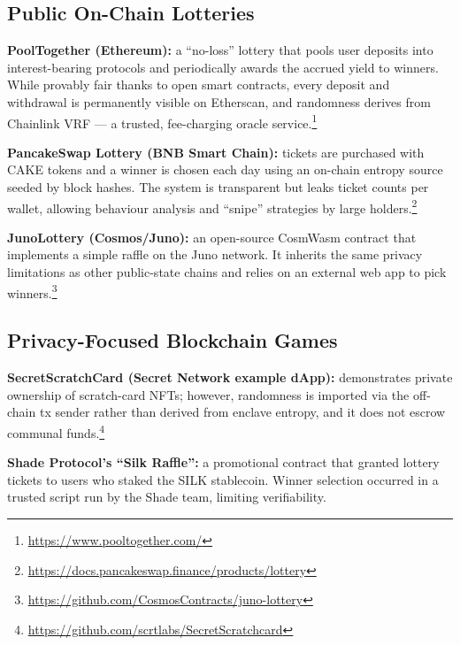 \documentclass[12pt]{article}
\begin{document}
\subsection*{Public On-Chain Lotteries}
\textbf{PoolTogether (Ethereum):} a ``no-loss'' lottery that pools user deposits into interest-bearing protocols and periodically awards the accrued yield to winners.  While provably fair thanks to open smart contracts, every deposit and withdrawal is permanently visible on Etherscan, and randomness derives from Chainlink VRF --- a trusted, fee-charging oracle service.\footnote{\url{https://www.pooltogether.com/}}

\textbf{PancakeSwap Lottery (BNB Smart Chain):} tickets are purchased with CAKE tokens and a winner is chosen each day using an on-chain entropy source seeded by block hashes.  The system is transparent but leaks ticket counts per wallet, allowing behaviour analysis and ``snipe'' strategies by large holders.\footnote{\url{https://docs.pancakeswap.finance/products/lottery}}

\textbf{JunoLottery (Cosmos/Juno):} an open-source CosmWasm contract that implements a simple raffle on the Juno network.  It inherits the same privacy limitations as other public-state chains and relies on an external web app to pick winners.\footnote{\url{https://github.com/CosmosContracts/juno-lottery}}

\subsection*{Privacy-Focused Blockchain Games}
\textbf{SecretScratchCard (Secret Network example dApp):} demonstrates private ownership of scratch-card NFTs; however, randomness is imported via the off-chain tx sender rather than derived from enclave entropy, and it does not escrow communal funds.\footnote{\url{https://github.com/scrtlabs/SecretScratchcard}}

\textbf{Shade Protocol's ``Silk Raffle'':} a promotional contract that granted lottery tickets to users who staked the SILK stablecoin.  Winner selection occurred in a trusted script run by the Shade team, limiting verifiability.
\end{document}
